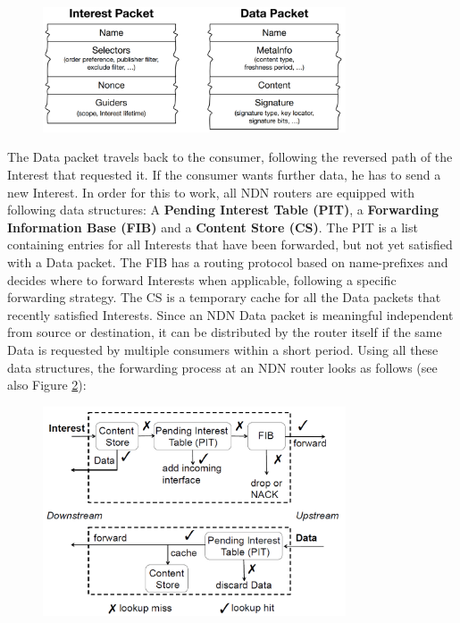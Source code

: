 \begin{figure}[ht]
 	\centering
 	\includegraphics[width=0.8\textwidth]{figures/Packets_in_the_NDN_Architecture.png}
 	\label{fig:fundamentals:NDNPackagestructure}
 \end{figure}
 
 The Data packet travels back to the consumer, following the reversed path of the Interest that requested it. If the consumer wants further data, he has to send a new Interest. In order for this to work, all NDN routers are equipped with following data structures: A \textbf{Pending Interest Table (PIT)}, a \textbf{Forwarding Information Base (FIB)} and a \textbf{Content Store (CS)}. The PIT is a list containing entries for all Interests that have been forwarded, but not yet satisfied with a Data packet. The FIB has a routing protocol based on name-prefixes and decides where to forward Interests when applicable, following a specific forwarding strategy. The CS is a temporary cache for all the Data packets that recently satisfied Interests. Since an NDN Data packet is meaningful independent from source or destination, it can be distributed by the router itself if the same Data is requested by multiple consumers within a short period. Using all these data structures, the forwarding process at an NDN router looks as follows (see also Figure \ref{fig:fundamentals:NDNForwardingProcess}):
 
 \begin{figure}[ht]
 	\centering
 	\includegraphics[width=0.8\textwidth]{figures/Forwarding_process_at_NDN_Router.png}
 	\label{fig:fundamentals:NDNForwardingProcess}
 \end{figure}
 
